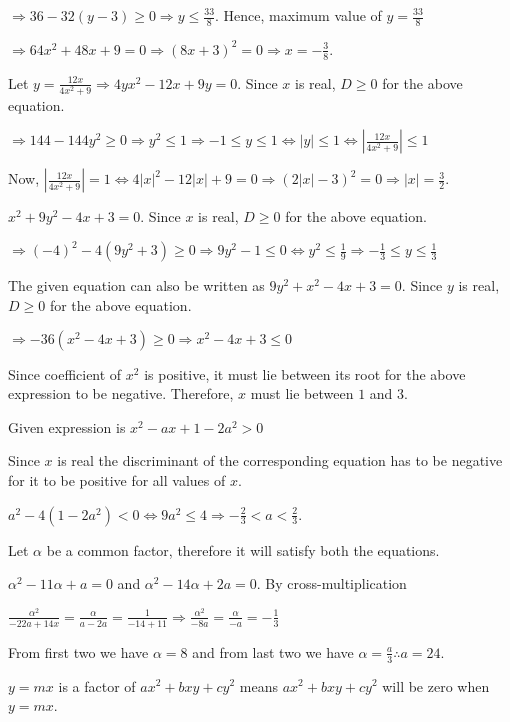   $\Rightarrow 36 - 32(y - 3) \ge 0\Rightarrow y \le \frac{33}{8}$. Hence, maximum value of $y = \frac{33}{8}$

  $\Rightarrow 64x^2 + 48x + 9 = 0\Rightarrow (8x + 3)^2 = 0 \Rightarrow x = -\frac{3}{8}$.
\item Let $y = \frac{12x}{4x^2 + 9}\Rightarrow 4yx^2 - 12x + 9y = 0$. Since $x$ is real, $D \ge 0$ for the
  above equation.

  $\Rightarrow 144 - 144y^2 \ge 0\Rightarrow y^2 \le 1\Rightarrow -1 \le y \le 1 \Leftrightarrow |y| \le 1
  \Leftrightarrow\left|\frac{12x}{4x^2 + 9}\right| \le 1$

  Now, $\left|\frac{12x}{4x^2 + 9}\right| = 1 \Leftrightarrow 4|x|^2 - 12|x| + 9 = 0\Rightarrow (2|x| - 3)^2
  = 0 \Rightarrow |x| = \frac{3}{2}$.
\item $x^2 + 9y^2 - 4x + 3 = 0$. Since $x$ is real, $D \ge 0$ for the above equation.

  $\Rightarrow (-4)^2 - 4(9y^2 + 3) \ge 0\Rightarrow 9y^2 - 1 \le 0 \Leftrightarrow y^2 \le
  \frac{1}{9}\Rightarrow -\frac{1}{3} \le y \le \frac{1}{3}$

  The given equation can also be written as $9y^2 + x^2 - 4x + 3 = 0$. Since $y$ is real, $D \ge 0$ for the
  above equation.

  $\Rightarrow -36(x^2 - 4x + 3) \ge 0\Rightarrow x^2 - 4x + 3 \le 0$

  Since coefficient of $x^2$ is positive, it must lie between its root for the above expression to be negative.
  Therefore, $x$ must lie between $1$ and $3$.
\item Given expression is $x^2 - ax + 1 - 2a^2 > 0$

  Since $x$ is real the discriminant of the corresponding equation has to be negative for it to be positive
  for all values of $x$.

  $a^2 - 4(1 - 2a^2) < 0 \Leftrightarrow 9a^2 \le 4\Rightarrow -\frac{2}{3} < a < \frac{2}{3}$.
\item Let $\alpha$ be a common factor, therefore it will satisfy both the equations.

  $\alpha^2 - 11\alpha + a = 0$ and $\alpha^2 - 14\alpha + 2a = 0$. By cross-multiplication

  $\frac{\alpha^2}{-22a + 14x} = \frac{\alpha}{a - 2a} = \frac{1}{-14 + 11}\Rightarrow \frac{\alpha^2}{-8a}
  = \frac{\alpha}{-a} = -\frac{1}{3}$

  From first two we have $\alpha = 8$ and from last two we have $\alpha = \frac{a}{3}\therefore a = 24$.
\item $y = mx$ is a factor of $ax^2 + bxy + cy^2$ means $ax^2 + bxy + cy^2$ will be zero when
  $y = mx$.

